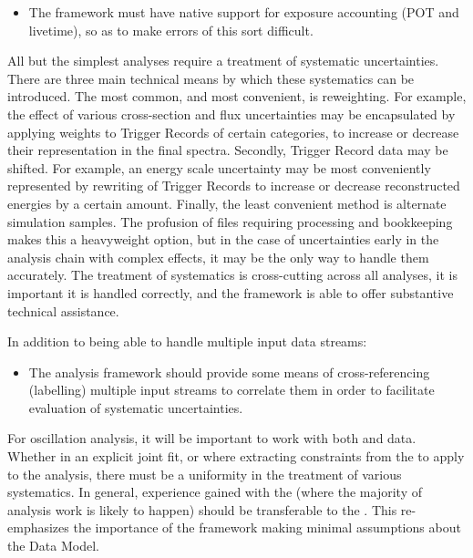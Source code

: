 \documentclass[../main-v1.tex]{subfiles}
\begin{document}
\begin{itemize}

\item The framework must have native support for exposure accounting (POT and livetime), so as to make errors of this sort difficult.
\end{itemize}


All but the simplest analyses require a treatment of systematic uncertainties. There are three main technical means by which these systematics can be introduced. The most common, and most convenient, is reweighting. For example, the effect of various cross-section and flux uncertainties may be encapsulated by applying weights to Trigger Records of certain categories, to increase or decrease their representation in the final spectra. Secondly, Trigger Record data may be shifted. For example, an energy scale uncertainty may be most conveniently represented by rewriting of Trigger Records to increase or decrease reconstructed energies by a certain amount. Finally, the least convenient method is alternate simulation samples. The profusion of files requiring processing and bookkeeping makes this a heavyweight option, but in the case of uncertainties early in the analysis chain with complex effects, it may be the only way to handle them accurately. The treatment of systematics is cross-cutting across all analyses, it is important it is handled correctly, and the framework is able to offer substantive technical assistance.

In addition to being able to handle multiple input data streams:

\begin{itemize}
\item The analysis framework should provide some means of cross-referencing (labelling) multiple input streams to correlate them in order to facilitate evaluation of systematic uncertainties.
\end{itemize}

For oscillation analysis, it will be important to work with both  and  data. Whether in an explicit joint fit, or where extracting constraints from the  to apply to the  analysis, there must be a uniformity in the treatment of various systematics. In general, experience gained with the  (where the majority of analysis work is likely to happen) should be transferable to the .  This re-emphasizes the importance of the framework making minimal assumptions about the Data Model.
\end{document}
